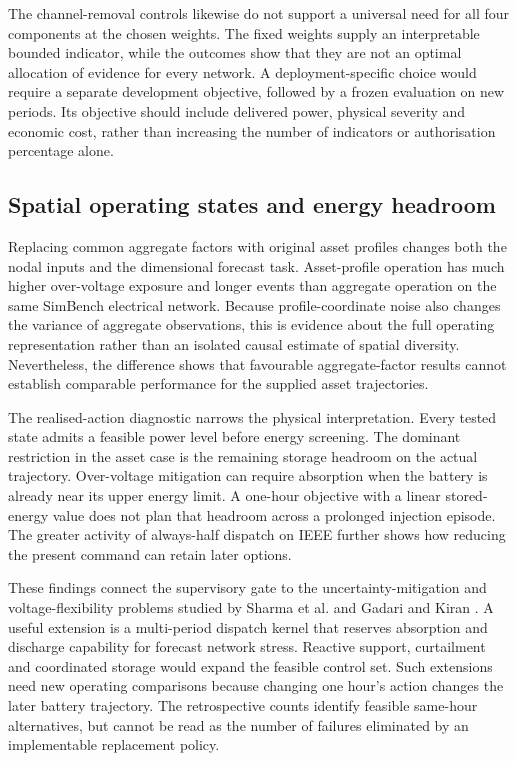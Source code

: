 \documentclass[preprint,12pt]{elsarticle}
\begin{document}
The channel-removal controls likewise do not support a universal need for all four components at the chosen weights. The fixed weights supply an interpretable bounded indicator, while the outcomes show that they are not an optimal allocation of evidence for every network. A deployment-specific choice would require a separate development objective, followed by a frozen evaluation on new periods. Its objective should include delivered power, physical severity and economic cost, rather than increasing the number of indicators or authorisation percentage alone.

\subsection{Spatial operating states and energy headroom}
Replacing common aggregate factors with original asset profiles changes both the nodal inputs and the dimensional forecast task. Asset-profile operation has much higher over-voltage exposure and longer events than aggregate operation on the same SimBench electrical network. Because profile-coordinate noise also changes the variance of aggregate observations, this is evidence about the full operating representation rather than an isolated causal estimate of spatial diversity. Nevertheless, the difference shows that favourable aggregate-factor results cannot establish comparable performance for the supplied asset trajectories.

The realised-action diagnostic narrows the physical interpretation. Every tested state admits a feasible power level before energy screening. The dominant restriction in the asset case is the remaining storage headroom on the actual trajectory. Over-voltage mitigation can require absorption when the battery is already near its upper energy limit. A one-hour objective with a linear stored-energy value does not plan that headroom across a prolonged injection episode. The greater activity of always-half dispatch on IEEE further shows how reducing the present command can retain later options.

These findings connect the supervisory gate to the uncertainty-mitigation and voltage-flexibility problems studied by Sharma et al. \cite{sharma} and Gadari and Kiran \cite{gadari}. A useful extension is a multi-period dispatch kernel that reserves absorption and discharge capability for forecast network stress. Reactive support, curtailment and coordinated storage would expand the feasible control set. Such extensions need new operating comparisons because changing one hour's action changes the later battery trajectory. The retrospective counts identify feasible same-hour alternatives, but cannot be read as the number of failures eliminated by an implementable replacement policy.
\end{document}

